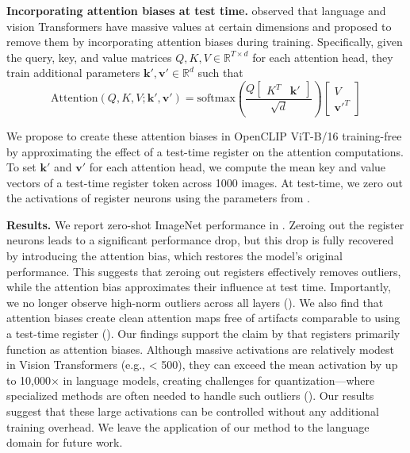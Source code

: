 \documentclass{article}
\begin{document}
\textbf{Incorporating attention biases at test time.} \cite{sunmassive} observed that language and vision Transformers have massive values at certain dimensions and proposed to remove them by incorporating attention biases during training. Specifically, given the query, key, and value matrices $Q, K, V \in \mathbb{R}^{T\times d}$ for each attention head, they train additional parameters $\mathbf{k}', \mathbf{v}' \in \mathbb{R}^{d}$ such that
$$\text{Attention}(Q, K, V; \mathbf{k}', \mathbf{v}') = \text{softmax}\left( \frac{Q \begin{bmatrix} K^T & \mathbf{k}' \end{bmatrix}}{\sqrt{d}} \right) \begin{bmatrix} V \\ \mathbf{v}'^T \end{bmatrix}$$

We propose to create these attention biases in OpenCLIP ViT-B/16 training-free by approximating the effect of a test-time register on the attention computations. To set $\mathbf{k'}$ and $\mathbf{v'}$ for each attention head, we compute the mean key and value vectors of a test-time register token across 1000 images. At test-time, we zero out the activations of register neurons using the parameters from . 

\textbf{Results.} We report zero-shot ImageNet performance in . Zeroing out the register neurons leads to a significant performance drop, but this drop is fully recovered by introducing the attention bias, which restores the model’s original performance. This suggests that zeroing out registers effectively removes outliers, while the attention bias approximates their influence at test time. Importantly, we no longer observe high-norm outliers across all layers (). We also find that attention biases create clean attention maps free of artifacts comparable to using a test-time register (). Our findings support the claim by \citet{sunmassive} that registers primarily function as attention biases. Although massive activations are relatively modest in Vision Transformers (e.g., < 500), they can exceed the mean activation by up to 10,000$\times$ in language models, creating challenges for quantization—where specialized methods are often needed to handle such outliers (\cite{xiao23c}). Our results suggest that these large activations can be controlled without any additional training overhead. We leave the application of our method to the language domain for future work.
\end{document}
